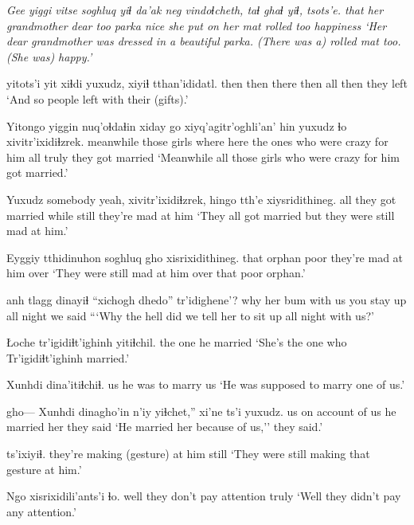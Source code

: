 \documentclass[12pt]{article}
\begin{document}
\gll \em Gee \em yiggi vitse           soghluq yiɬ da'ak neg  vindoɬcheth,    taɬ ghaɬ   yiɬ, tsots'e.
{} that  {her grandmother} dear  too parka nice {she put on her} mat rolled too happiness
\glt `Her dear grandmother was dressed in a beautiful parka. (There was a) rolled mat too. (She was) happy.'
\glend

 yitots'i yit xiɬdi yuxudz, xiyiɬ tthan'ididatl.
then         then    there then  all    then  {they left}
\glt `And so people left with their (gifts).'
\glend

\gll Yitongo   yiggin nuq'oɬdaɬin xiday go {xiyq'agitr'oghli'an' hin} yuxudz ɬo xivitr'ixidiɬzrek.
meanwhile those  girls       where here {the ones who were crazy for him} all    truly   {they got married}
\glt `Meanwhile all those girls who were crazy for him got married.'
\glend

\gll Yuxudz {somebody yeah,} xivitr'ixidiɬzrek, hingo tth'e xiysridithineg. 
all {} {they got married}   while still {they're mad at him}      
\glt `They all got married but they were still mad at him.'
\glend

\gll Eyggiy tthidinuhon soghluq {gho xisrixidithineg}.
 that   orphan      poor    {they're mad at him over}
\glt `They were still mad at him over that poor orphan.'
\glend

 anh tlagg dinayiɬ {``xichogh dhedo''}         tr'idighene'?
why       her bum   {with us} {you stay up all night} {we said}
\glt ```Why the hell did we tell her to sit up all night with us?'
\glend

\gll Łoche tr'igidiɬt'ighinh yitiɬchil.
{}        {}               {the one he married}
\glt `She's the one who Tr'igidiɬt'ighinh married.'
\glend

\gll Xunhdi dina'itiɬchiɬ. 
us     {he was to marry us}
\glt `He was supposed to marry one of us.'
\glend

\gll gho--- Xunhdi dinagho'in       n'iy yiɬchet,''       xi'ne   ts'i   yuxudz.
{} us     {on account of us} {}  {he married her} {they said}
\glt `He married her because of us,'' they said.'
\glend

          ts'ixiyiɬ.
{they're making (gesture) at him} still
\glt `They were still making that gesture at him.'
\glend

\gll Ngo   {xisrixidili'ants'i} ɬo.
well {they don't pay attention} truly
\glt `Well they didn't pay any attention.'
\glend
\end{document}
